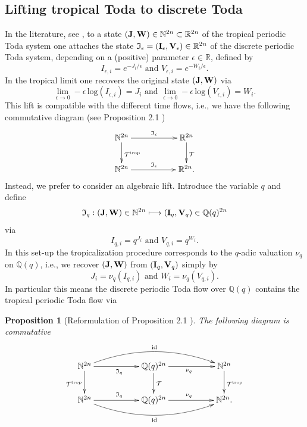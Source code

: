 \documentclass[11pt, a4paper]{amsart}
\newcommand{\eq}[1]{\begin{equation}#1 \end{equation}}
\newcommand{\eqst}[1]{\begin{equation*}#1\end{equation*}}
\theoremstyle{plain}
\newtheorem{proposition}{Proposition}[section]
\numberwithin{equation}{section}
\begin{document}
\subsection{Lifting tropical Toda to discrete Toda}

In the literature, see \cite{tokihiro1,inoue}, to a state $(\bold{J},\bold{W}) \in \mathbb N^{2n} \subset \mathbb R ^{2n}$ of the tropical periodic Toda system one attaches the state $\mathfrak I _\epsilon = (\bold{I}_\epsilon,\bold{V}_\epsilon) \in \mathbb R^{2n}$ of the discrete periodic Toda system, depending on a (positive) parameter $\epsilon \in \mathbb R$, defined by \eqst{I_{\epsilon,i} = e^{-J_i / \epsilon} \text{ and } V_{\epsilon,i} =e^{-W_i / \epsilon}.}
In the tropical limit one recovers the original state $(\bold{J},\bold{W})$ via \eqst{\lim_{\epsilon \to 0}-\epsilon \, \mathrm{log}(I_{\epsilon,i}) = J_i\text{ and } \lim_{\epsilon \to 0}-\epsilon \, \mathrm{log}(V_{\epsilon,i})=W_i.}
This lift is compatible with the different time flows, i.e., we have the following commutative diagram (see Proposition 2.1 \cite{tokihiro1}) \eqst{\xymatrix{\mathbb N^{2n} \ar[rr]^{\mathfrak I _\epsilon} \ar[d]^{\mathcal T^{\mathrm{trop}}} && \mathbb R^{2n} \ar[d]^{\mathcal T} \\ \mathbb N^{2n} \ar[rr]^{\mathfrak I_\epsilon} && \mathbb R^{2n}.}}
Instead, we prefer to consider an algebraic lift. Introduce the variable $q$ and define \eq{\label{q-lift}\mathfrak I _q : (\bold{J},\bold{W})\in\mathbb N^{2n} \longmapsto (\bold{I}_q,\bold{V}_q)\in \mathbb Q(q)^{2n}} via \eqst{I_{q,i} = q^{J_i} \text{ and } V_{q,i} = q^{W_i}.} In this set-up the tropicalization procedure corresponds to the $q$-adic valuation $\nu_q$ on $\mathbb Q(q)$, i.e., we recover $(\bold{J},\bold{W})$ from $(\bold{I}_q,\bold{V}_q)$ simply by \eqst{J_i = \nu_q(I_{q,i}) \text{ and } W_i= \nu_q(V_{q,i}).}
In particular this means the discrete periodic Toda flow over $\mathbb Q(q)$ contains the tropical periodic Toda flow via 
\begin{proposition}[Reformulation of Proposition 2.1  \cite{tokihiro1}]
\label{reformulation}
The following diagram is commutative
\eqst{\xymatrix{\mathbb N^{2n} \ar@/^1.5pc/[rrrr]^{\mathrm{id}}  \ar[d]_{\mathcal T ^{\mathrm{trop}}} \ar[rr]_{\mathfrak I _q} && \mathbb Q (q)^{2n} \ar[d]^{\mathcal T} \ar[rr]_{\nu_q} && \mathbb N^{2n} \ar[d]^{\mathcal T ^{\mathrm{trop}}} \\ \mathbb N^{2n} \ar@/_1.5pc/[rrrr]_{\mathrm{id}} \ar[rr]^{\mathfrak I _q} && \mathbb Q(q)^{2n}\ar[rr]^{\nu_q} && \mathbb N^{2n}.}}
\end{proposition}
\end{document}
